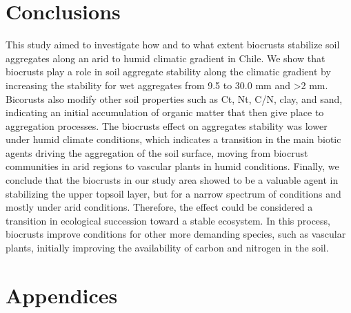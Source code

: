\section{Conclusions}

This study aimed to investigate how and to what extent biocrusts stabilize soil aggregates along an arid to humid climatic gradient in Chile. We show that biocrusts play a role in soil aggregate stability along the climatic gradient by increasing the stability for wet aggregates from 9.5 to 30.0 mm and >2 mm. Bicorusts also modify other soil properties such as Ct, Nt, C/N, clay, and sand, indicating an initial accumulation of organic matter that then give place to aggregation processes. The biocrusts effect on aggregates stability was lower under humid climate conditions, which indicates a transition in the main biotic agents driving the aggregation of the soil surface, moving from biocrust communities in arid regions to vascular plants in humid conditions.
Finally, we conclude that the biocrusts in our study area showed to be a valuable agent in stabilizing the upper topsoil layer, but for a narrow spectrum of conditions and mostly under arid conditions. Therefore, the effect could be considered a transition in ecological succession toward a stable ecosystem. In this process, biocrusts improve conditions for other more demanding species, such as vascular plants, initially improving the availability of carbon and nitrogen in the soil.

\section*{Appendices}

